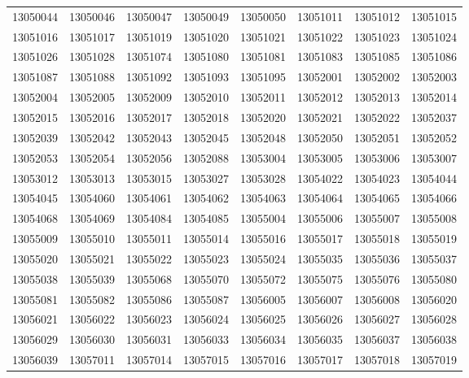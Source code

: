 \documentclass[letterpaper, abstract = on,listof=totoc, bibliography=totoc]{scrreprt}
\begin{document}
{\begin{longtable}{cccccccc}
13050044  &  13050046  &  13050047  &  13050049  &  13050050  &  13051011  &  13051012  &  13051015  \\ 
13051016  &  13051017  &  13051019  &  13051020  &  13051021  &  13051022  &  13051023  &  13051024  \\ 
13051026  &  13051028  &  13051074  &  13051080  &  13051081  &  13051083  &  13051085  &  13051086  \\ 
13051087  &  13051088  &  13051092  &  13051093  &  13051095  &  13052001  &  13052002  &  13052003  \\ 
13052004  &  13052005  &  13052009  &  13052010  &  13052011  &  13052012  &  13052013  &  13052014  \\ 
13052015  &  13052016  &  13052017  &  13052018  &  13052020  &  13052021  &  13052022  &  13052037  \\ 
13052039  &  13052042  &  13052043  &  13052045  &  13052048  &  13052050  &  13052051  &  13052052  \\ 
13052053  &  13052054  &  13052056  &  13052088  &  13053004  &  13053005  &  13053006  &  13053007  \\ 
13053012  &  13053013  &  13053015  &  13053027  &  13053028  &  13054022  &  13054023  &  13054044  \\ 
13054045  &  13054060  &  13054061  &  13054062  &  13054063  &  13054064  &  13054065  &  13054066  \\ 
13054068  &  13054069  &  13054084  &  13054085  &  13055004  &  13055006  &  13055007  &  13055008  \\ 
13055009  &  13055010  &  13055011  &  13055014  &  13055016  &  13055017  &  13055018  &  13055019  \\ 
13055020  &  13055021  &  13055022  &  13055023  &  13055024  &  13055035  &  13055036  &  13055037  \\ 
13055038  &  13055039  &  13055068  &  13055070  &  13055072  &  13055075  &  13055076  &  13055080  \\ 
13055081  &  13055082  &  13055086  &  13055087  &  13056005  &  13056007  &  13056008  &  13056020  \\ 
13056021  &  13056022  &  13056023  &  13056024  &  13056025  &  13056026  &  13056027  &  13056028  \\ 
13056029  &  13056030  &  13056031  &  13056033  &  13056034  &  13056035  &  13056037  &  13056038  \\ 
13056039  &  13057011  &  13057014  &  13057015  &  13057016  &  13057017  &  13057018  &  13057019  \\ 

\end{longtable}}
\end{document}
